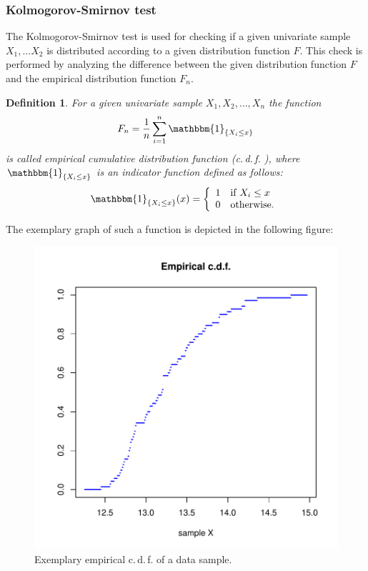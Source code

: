 \documentclass[a4paper, 12pt, titlepage, headsepline, listof = totoc, bibliography = totoc, numbers = noenddot]{scrartcl}
\newcommand{\cdf}{c.\,d.\,f. }
\newtheorem{df}{Definition}
\begin{document}
\subsubsection{Kolmogorov-Smirnov test}\label{sec:kolm-smir}
The Kolmogorov-Smirnov test is used for checking if a given univariate sample
$X_1,\dots X_2$ is distributed according to a given distribution function $F$.
This check is performed by analyzing the difference between the given
distribution function $F$ and the empirical distribution function $F_n$.
\begin{df}
For a given univariate sample $X_1, X_2, \dots, X_n$ the function
\[F_n=\frac{1}{n}\sum_{i=1}^n \mathbbm{1}_{\{X_i\le x\}}\] is called empirical
cumulative distribution function (\cdf), where $\mathbbm{1}_{\{X_i\le x\}}$ is an
indicator function defined as follows: \[\mathbbm{1}_{\{X_i\le x\}}(x)=\left\lbrace 
\begin{array}{cll}
                 1 & \mbox{if} \ X_i\le x\\
                 0 & \mbox{otherwise}.
\end{array} 
\right.\]
\end{df}
The exemplary graph of such a function is depicted in the following figure:

\begin{figure}[h!]
\includegraphics[width=\textwidth]{report-empiricFunc}
\caption{Exemplary empirical \cdf of a data sample.}
\label{fig:empiricFunc}
\end{figure}
\end{document}
